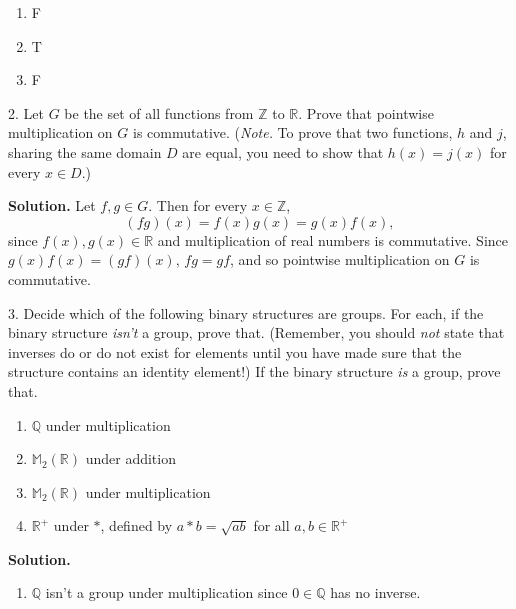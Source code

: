 \documentclass[10pt,]{book}
\theoremstyle{plain}
\theoremstyle{definition}
\theoremstyle{definition}
\theoremstyle{definition}
\theoremstyle{definition}
\numberwithin{equation}{section}
\def\Z{\mathbb{Z}}
\def\R{\mathbb{R}}
\def\Q{\mathbb{Q}}
\def\M{\mathbb{M}}
\begin{document}
\begin{exerciselist}
\begin{multicols}{4}
\begin{enumerate}[label=(\alph*)]
\item\hypertarget{li-111}{}F%
\item\hypertarget{li-112}{}T%
\item\hypertarget{li-113}{}F%
\end{enumerate}
\end{multicols}
\item[2.]\hypertarget{exercise-13}{}Let \(G\) be the set of all functions from \(\Z\) to \(\R\). Prove that pointwise multiplication on \(G\) is commutative. (\emph{Note.} To prove that two functions, \(h\) and \(j\), sharing the same domain \(D\) are equal, you need to show that \(h(x)=j(x)\) for every \(x\in D\).)%
\par\smallskip
\par\smallskip
\noindent\textbf{Solution.}\hypertarget{solution-13}{}\quad
Let \(f,g\in G\). Then for every \(x\in \Z\),%
\begin{equation*}
(fg)(x)=f(x)g(x)=g(x)f(x),
\end{equation*}
since \(f(x), g(x)\in \R\) and multiplication of real numbers is commutative. Since \(g(x)f(x)=(gf)(x)\), \(fg=gf\), and so pointwise multiplication on \(G\) is commutative.%
\item[3.]\hypertarget{exercise-14}{}Decide which of the following binary structures are groups. For each, if the binary structure \emph{isn't} a group, prove that. (Remember, you should \emph{not} state that inverses do or do not exist for elements until you have made sure that the structure contains an identity element!) If the binary structure \emph{is} a group, prove that. \leavevmode%
\begin{enumerate}[label=(\alph*)]
\item\hypertarget{li-114}{}\(\Q\) under multiplication%
\item\hypertarget{li-115}{}\(\M_2(\R)\) under addition%
\item\hypertarget{li-116}{}\(\M_2(\R)\) under multiplication%
\item\hypertarget{li-117}{}\(\R^+\) under \(*\), defined by \(a*b=\sqrt{ab}\) for all \(a,b\in \R^+\)%
\end{enumerate}
%
\par\smallskip
\par\smallskip
\noindent\textbf{Solution.}\hypertarget{solution-14}{}\quad
\leavevmode%
\begin{enumerate}[label=(\alph*)]
\item\hypertarget{li-118}{}\(\Q\) isn't a group under multiplication since \(0\in \Q\) has no inverse.%

\end{enumerate}
\end{exerciselist}
\end{document}
